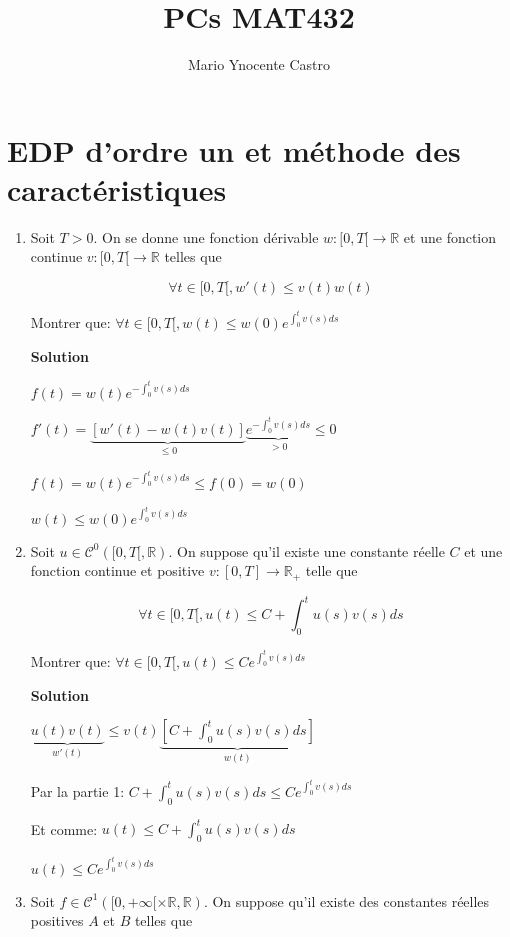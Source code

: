 \documentclass[10pt,a4paper,oneside]{article}
\newenvironment{exercice}[1][Exercice]{\begin{trivlist}
\item[\hskip \labelsep {\bfseries #1}]}{\end{trivlist}}
\begin{document}
\title{PCs MAT432}
\author{Mario Ynocente Castro}

\maketitle

\section{EDP d'ordre un et méthode des caractéristiques}

\begin{exercice}{1}

\begin{enumerate}
\item
Soit $T > 0$. On se donne une fonction dérivable $w : [0,T[ \to \mathbb{R}$ et une fonction continue $v : [0,T[ \to \mathbb{R}$ telles que

\[ \forall t \in [0,T[, w'(t) \leq v(t) w(t) \]

Montrer que: $\forall t \in [0,T[, w(t) \leq w(0) e^{\int_{0}^t v(s)ds}$

\textbf{Solution}

$f(t) = w(t) e^{-\int_{0}^{t} v(s)ds}$

$f'(t)= \underbrace{[w'(t) - w(t)v(t)]}_{\leq 0} \underbrace{e^{-\int_{0}^{t} v(s)ds}}_{> 0} \leq 0$

$f(t) = w(t) e^{-\int_{0}^{t} v(s)ds} \leq f(0) = w(0)$

$\boxed{w(t) \leq w(0) e^{\int_{0}^t v(s)ds}}$

\item
Soit $u \in \mathcal{C}^0([0,T[,\mathbb{R})$. On suppose qu'il existe une constante réelle $C$ et une fonction continue et positive $v : [0,T] \to \mathbb{R_+}$ telle que

\[ \forall t \in [0,T[, u(t) \leq C + \int_0^t u(s)v(s)ds \]

Montrer que: $\forall t \in [0,T[, u(t) \leq C e^{\int_0^t v(s)ds}$

\textbf{Solution}

$\underbrace{u(t)v(t)}_{w'(t)} \leq v(t) \underbrace{[C + \int_0^t u(s)v(s)ds]}_{w(t)}$

Par la partie 1: $C + \int_0^t u(s) v(s) ds \leq C e^{\int_0^t v(s)ds}$

Et comme: $u(t) \leq C + \int_0^t u(s)v(s)ds$

$\boxed{u(t) \leq C e^{\int_0^t v(s)ds}}$

\item
Soit $f \in \mathcal{C}^1([0,+\infty[ \times \mathbb{R}, \mathbb{R})$. On suppose qu'il existe des constantes réelles positives $A$ et $B$ telles que


\end{enumerate}
\end{exercice}
\end{document}
